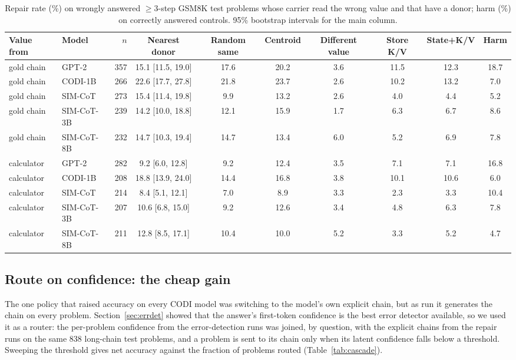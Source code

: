 \documentclass{article}
\begin{document}
\begin{table}[h]
\caption{Repair rate (\%) on wrongly answered $\geq 3$-step GSM8K test problems whose carrier read the wrong value and that have a donor; harm (\%) on correctly answered controls. 95\% bootstrap intervals for the main column.}
\label{tab:repair}
\centering
\scriptsize
\setlength{\tabcolsep}{3pt}
\begin{tabular}{llrccccccc}
\toprule
Value from & Model & $n$ & Nearest donor & Random same & Centroid & Different value & Store K/V & State+K/V & Harm \\
\midrule
gold chain & GPT-2 & 357 & 15.1 [11.5, 19.0] & 17.6 & 20.2 & 3.6 & 11.5 & 12.3 & 18.7 \\
gold chain & CODI-1B & 266 & 22.6 [17.7, 27.8] & 21.8 & 23.7 & 2.6 & 10.2 & 13.2 & 7.0 \\
gold chain & SIM-CoT & 273 & 15.4 [11.4, 19.8] & 9.9 & 13.2 & 2.6 & 4.0 & 4.4 & 5.2 \\
gold chain & SIM-CoT-3B & 239 & 14.2 [10.0, 18.8] & 12.1 & 15.9 & 1.7 & 6.3 & 6.7 & 8.6 \\
gold chain & SIM-CoT-8B & 232 & 14.7 [10.3, 19.4] & 14.7 & 13.4 & 6.0 & 5.2 & 6.9 & 7.8 \\
\midrule
calculator & GPT-2 & 282 & 9.2 [6.0, 12.8] & 9.2 & 12.4 & 3.5 & 7.1 & 7.1 & 16.8 \\
calculator & CODI-1B & 208 & 18.8 [13.9, 24.0] & 14.4 & 16.8 & 3.8 & 10.1 & 10.6 & 6.0 \\
calculator & SIM-CoT & 214 & 8.4 [5.1, 12.1] & 7.0 & 8.9 & 3.3 & 2.3 & 3.3 & 10.4 \\
calculator & SIM-CoT-3B & 207 & 10.6 [6.8, 15.0] & 9.2 & 12.6 & 3.4 & 4.8 & 6.3 & 7.8 \\
calculator & SIM-CoT-8B & 211 & 12.8 [8.5, 17.1] & 10.4 & 10.0 & 5.2 & 3.3 & 5.2 & 4.7 \\
\bottomrule
\end{tabular}
\end{table}

\subsection{Route on confidence: the cheap gain}\label{sec:cascade}

The one policy that raised accuracy on every CODI model was switching to the model's own explicit chain, but as run it generates the chain on every problem. Section~\ref{sec:errdet} showed that the answer's first-token confidence is the best error detector available, so we used it as a router: the per-problem confidence from the error-detection runs was joined, by question, with the explicit chains from the repair runs on the same 838 long-chain test problems, and a problem is sent to its chain only when its latent confidence falls below a threshold. Sweeping the threshold gives net accuracy against the fraction of problems routed (Table~\ref{tab:cascade}).
\end{document}
